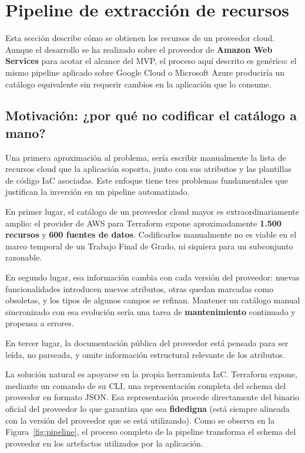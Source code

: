 \documentclass{article}
\begin{document}
    \section{Pipeline de extracción de recursos}
    {
        \setlength{\parskip}{1em}
        \label{sec:pipeline}
        \justify
        Esta sección describe cómo se obtienen los recursos de un proveedor cloud. 
        Aunque el desarrollo se ha realizado sobre el
        proveedor de \textbf{Amazon Web Services} para acotar el alcance del MVP, el
        proceso aquí descrito es genérico: el mismo pipeline aplicado sobre Google
        Cloud o Microsoft Azure produciría un catálogo equivalente sin requerir
        cambios en la aplicación que lo consume.

        \subsection{Motivación: ¿por qué no codificar el catálogo a mano?}
        \justify
        Una primera aproximación al problema, sería escribir
        manualmente la lista de recursos cloud que la aplicación soporta, junto con
        sus atributos y las plantillas de código IaC asociadas. Este enfoque tiene tres
        problemas fundamentales que justifican la inversión en un pipeline automatizado.

        \justify
        En primer lugar, el catálogo de un proveedor cloud mayor es extraordinariamente
        amplio: el provider de AWS para Terraform expone aproximadamente \textbf{1.500
        recursos} y \textbf{600 fuentes de datos}. Codificarlos manualmente no es viable en el marco
        temporal de un Trabajo Final de Grado, ni siquiera para un subconjunto
        razonable.

        \justify
        En segundo lugar, esa información cambia con cada versión del
        proveedor: nuevas funcionalidades introducen nuevos atributos, otras quedan
        marcadas como obsoletas, y los tipos de algunos campos se refinan. Mantener un
        catálogo manual sincronizado con esa evolución sería una tarea de
        \textbf{mantenimiento} continuado y propensa a errores.
        
        \justify
        En tercer lugar, la documentación pública del proveedor está pensada para ser
        leída, no parseada, y omite información estructural relevante de los atributos.

        \justify
        La solución natural es apoyarse en la propia herramienta IaC.
        Terraform expone, mediante un comando de su CLI, una representación completa del schema del proveedor en formato JSON.
        Esa representación procede directamente del binario oficial del proveedor lo que garantiza que sea
        \textbf{fidedigna} (está siempre alineada con la versión del proveedor que se
        está utilizando). Como se observa en la Figura~\ref{fig:pipeline}, el proceso completo de la pipeline transforma el schema del proveedor en los artefactos utilizados por la aplicación.

}
\end{document}
